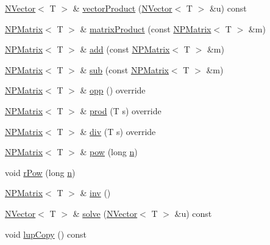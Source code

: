 \begin{DoxyCompactItemize}
\item 
\mbox{\hyperlink{class_n_vector}{N\+Vector}}$<$ T $>$ \& \mbox{\hyperlink{class_n_p_matrix_a8bb14c131409b94a8b52ec6a932098e5}{vector\+Product}} (\mbox{\hyperlink{class_n_vector}{N\+Vector}}$<$ T $>$ \&u) const
\item 
\mbox{\hyperlink{class_n_p_matrix}{N\+P\+Matrix}}$<$ T $>$ \& \mbox{\hyperlink{class_n_p_matrix_a79dfadc3945a91d9083af8da34b7412f}{matrix\+Product}} (const \mbox{\hyperlink{class_n_p_matrix}{N\+P\+Matrix}}$<$ T $>$ \&m)
\item 
\mbox{\hyperlink{class_n_p_matrix}{N\+P\+Matrix}}$<$ T $>$ \& \mbox{\hyperlink{class_n_p_matrix_a3f15ce97eeb7ddedac0741a5bdcf95c7}{add}} (const \mbox{\hyperlink{class_n_p_matrix}{N\+P\+Matrix}}$<$ T $>$ \&m)
\item 
\mbox{\hyperlink{class_n_p_matrix}{N\+P\+Matrix}}$<$ T $>$ \& \mbox{\hyperlink{class_n_p_matrix_adbaf5fc3417b46834bfb5392db7ef92b}{sub}} (const \mbox{\hyperlink{class_n_p_matrix}{N\+P\+Matrix}}$<$ T $>$ \&m)
\item 
\mbox{\hyperlink{class_n_p_matrix}{N\+P\+Matrix}}$<$ T $>$ \& \mbox{\hyperlink{class_n_p_matrix_a9b38999d88043fa71686351ded183de8}{opp}} () override
\item 
\mbox{\hyperlink{class_n_p_matrix}{N\+P\+Matrix}}$<$ T $>$ \& \mbox{\hyperlink{class_n_p_matrix_adb7ad767393a1fc0d240e1bb0c73b1f4}{prod}} (T s) override
\item 
\mbox{\hyperlink{class_n_p_matrix}{N\+P\+Matrix}}$<$ T $>$ \& \mbox{\hyperlink{class_n_p_matrix_a24b3fd013f74fdbde91f89095e9ca584}{div}} (T s) override
\item 
\mbox{\hyperlink{class_n_p_matrix}{N\+P\+Matrix}}$<$ T $>$ \& \mbox{\hyperlink{class_n_p_matrix_ab131f8f10f6ab2aa9d9ca6467f0ffbf5}{pow}} (long \mbox{\hyperlink{class_n_p_matrix_afc181b7652d9427125c72c38d7c1498d}{n}})
\item 
void \mbox{\hyperlink{class_n_p_matrix_acd64a88eccd7644ff34a0f42e4313b09}{r\+Pow}} (long \mbox{\hyperlink{class_n_p_matrix_afc181b7652d9427125c72c38d7c1498d}{n}})
\item 
\mbox{\hyperlink{class_n_p_matrix}{N\+P\+Matrix}}$<$ T $>$ \& \mbox{\hyperlink{class_n_p_matrix_ac672c69c4b0ec298ac3e8326fcce48cb}{inv}} ()
\item 
\mbox{\hyperlink{class_n_vector}{N\+Vector}}$<$ T $>$ \& \mbox{\hyperlink{class_n_p_matrix_a416d816f2f0d1f01f739b10c82f42d29}{solve}} (\mbox{\hyperlink{class_n_vector}{N\+Vector}}$<$ T $>$ \&u) const
\item 
void \mbox{\hyperlink{class_n_p_matrix_a2eba5b3c2096bfb2ccac4e077880942a}{lup\+Copy}} () const

\end{DoxyCompactItemize}
